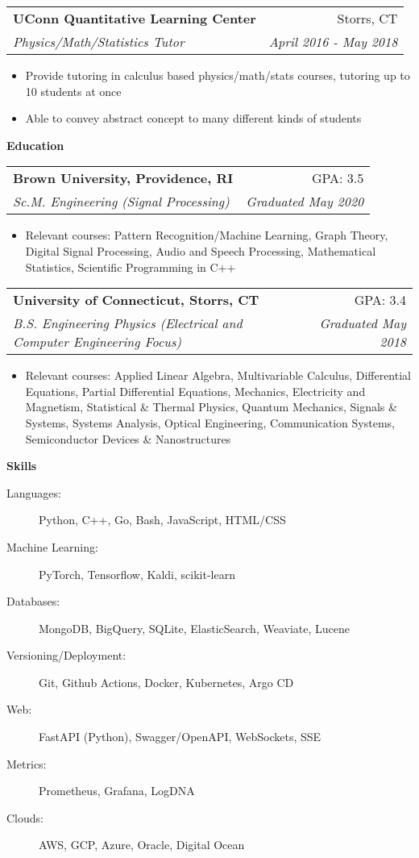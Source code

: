 \documentclass[letterpaper,11pt]{article}
\makeatletter
\newcommand{\resitem}[1]{\item #1 \vspace{-2pt}}
\newcommand{\resheading}[1]{{\large \colorbox{mygrey}{\begin{minipage}{\textwidth}{\textbf{#1 \vphantom{p\^{E}}}}\end{minipage}}}}
\newcommand{\ressubheading}[4]{
\begin{tabular*}{6.9in}{l@{\extracolsep{\fill}}r}
		\textbf{#1} & #2 \\
		\textit{#3} & \textit{#4} \\
\end{tabular*}\vspace{-6pt}}
\makeatother
\begin{document}
\begin{description}
\item
	\ressubheading{UConn Quantitative Learning Center}{Storrs, CT}{Physics/Math/Statistics Tutor}{April 2016 - May 2018}
	\begin{itemize}
		\resitem{Provide tutoring in calculus based physics/math/stats courses, tutoring up to 10 students at once}
		\resitem{Able to convey abstract concept to many different kinds of students}
	\end{itemize}
\end{description}


\resheading{Education}
\begin{description}
\item
	\ressubheading{Brown University, Providence, RI}{GPA: 3.5}{Sc.M. Engineering (Signal Processing)}{Graduated May 2020}
	\begin{itemize}
		\resitem{Relevant courses: Pattern Recognition/Machine Learning, Graph Theory, Digital Signal Processing, Audio and Speech Processing, Mathematical Statistics, Scientific Programming in C++}
	\end{itemize}

\item
	\ressubheading{University of Connecticut, Storrs, CT}{GPA: 3.4}{B.S. Engineering Physics (Electrical and Computer Engineering Focus)}{Graduated May 2018}
	\begin{itemize}
		\resitem{Relevant courses: Applied Linear Algebra, Multivariable Calculus, Differential Equations, Partial Differential Equations, Mechanics, Electricity and Magnetism, Statistical \& Thermal Physics, Quantum Mechanics, Signals \& Systems, Systems Analysis, Optical Engineering, Communication Systems, Semiconductor Devices \& Nanostructures}
	\end{itemize}

\end{description}

\resheading{Skills}
\begin{description}
    \item[Languages:]
    Python, C++, Go, Bash, JavaScript, HTML/CSS
    \item[Machine Learning:]
    PyTorch, Tensorflow, Kaldi, scikit-learn
    \item[Databases:]
    MongoDB, BigQuery, SQLite, ElasticSearch, Weaviate, Lucene
    \item[Versioning/Deployment:]
    Git, Github Actions, Docker, Kubernetes, Argo CD
    \item[Web:]
    FastAPI (Python), Swagger/OpenAPI, WebSockets, SSE
    \item[Metrics:]
    Prometheus, Grafana, LogDNA
    \item[Clouds:]
    AWS, GCP, Azure, Oracle, Digital Ocean
\end{description}
\end{document}
